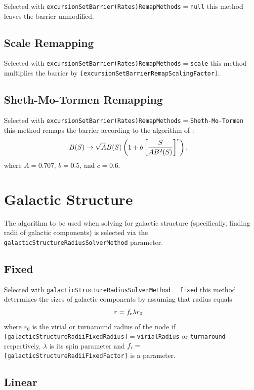 Selected with {\tt excursionSetBarrier(Rates)RemapMethods}$=${\tt null} this method leaves the barrier unmodified.

\subsection{Scale Remapping}

Selected with {\tt excursionSetBarrier(Rates)RemapMethods}$=${\tt scale} this method multiplies the barrier by {\tt [excursionSetBarrierRemapScalingFactor]}.

\subsection{Sheth-Mo-Tormen Remapping}

Selected with {\tt excursionSetBarrier(Rates)RemapMethods}$=${\tt Sheth-Mo-Tormen} this method remaps the barrier according to the algorithm of \cite{sheth_ellipsoidal_2001}:
\begin{equation}
 B(S) \rightarrow \sqrt{A} B(S) \left(1 + b \left[ {S \over A B^2(S)}\right]^c\right),
\end{equation}
where $A=0.707$, $b=0.5$, and $c=0.6$.

\section{Galactic Structure}

The algorithm to be used when solving for galactic structure (specifically, finding radii of galactic components) is selected via the {\tt galacticStructureRadiusSolverMethod} parameter.

\subsection{Fixed}

Selected with {\tt galacticStructureRadiusSolverMethod}$=${\tt fixed} this method determines the sizes of galactic components by assuming that radius equals
\begin{equation}
 r = f_{\rm r} \lambda r_0
\end{equation}
where $r_0$ is the virial or turnaround radius of the \gls{node} if {\tt [galacticStructureRadiiFixedRadius]}$=${\tt virialRadius} or {\tt turnaround} respectively, $\lambda$ is its spin parameter and $f_{\rm r}=${\tt [galacticStructureRadiiFixedFactor]} is a parameter.

\subsection{Linear}


